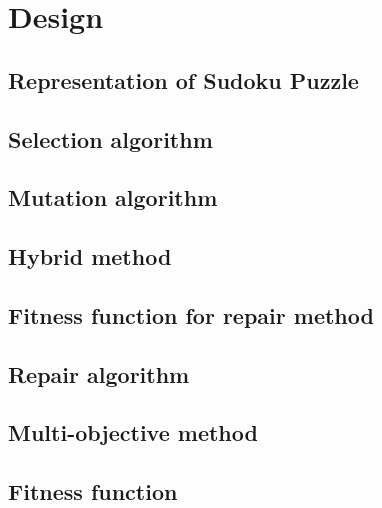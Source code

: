\documentclass[a4paper,11pt]{article}
\begin{document}
\section{Design}
	
\subsection{Representation of Sudoku Puzzle}

\subsection{Selection algorithm}

\subsection{Mutation algorithm}

\subsection{Hybrid method}

\subsection{Fitness function for repair method}

\subsection{Repair algorithm}

\subsection{Multi-objective method}

\subsection{Fitness function}
\end{document}
